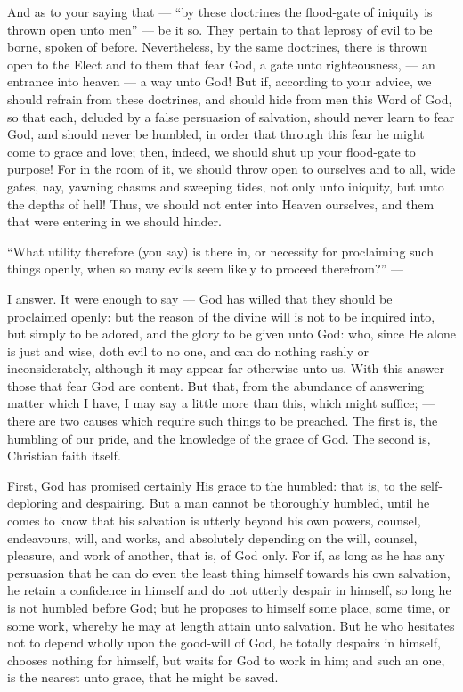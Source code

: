 And as to your saying that — “by these doctrines the flood-gate of iniquity is thrown open unto men” — be it so. They pertain to that leprosy of evil to be borne, spoken of before. Nevertheless, by the same doctrines, there is thrown open to the Elect and to them that fear God, a gate unto righteousness, — an entrance into heaven — a way unto God! But if, according to your advice, we should refrain from these doctrines, and should hide from men this Word of God, so that each, deluded by a false persuasion of salvation, should never learn to fear God, and should never be humbled, in order that through this fear he might come to grace and love; then, indeed, we should shut up your flood-gate to purpose! For in the room of it, we should throw open to ourselves and to all, wide gates, nay, yawning chasms and sweeping tides, not only unto iniquity, but unto the depths of hell! Thus, we should not enter into Heaven ourselves, and them that were entering in we should hinder.

“What utility therefore (you say) is there in, or necessity for proclaiming such things openly, when so many evils seem likely to proceed therefrom?” —

I answer. It were enough to say — God has willed that they should be proclaimed openly: but the reason of the divine will is not to be inquired into, but simply to be adored, and the glory to be given unto God: who, since He alone is just and wise, doth evil to no one, and can do nothing rashly or inconsiderately, although it may appear far otherwise unto us. With this answer those that fear God are content. But that, from the abundance of answering matter which I have, I may say a little more than this, which might suffice; — there are two causes which require such things to be preached. The first is, the humbling of our pride, and the knowledge of the grace of God. The second is, Christian faith itself.

First, God has promised certainly His grace to the humbled: that is, to the self-deploring and despairing. But a man cannot be thoroughly humbled, until he comes to know that his salvation is utterly beyond his own powers, counsel, endeavours, will, and works, and absolutely depending on the will, counsel, pleasure, and work of another, that is, of God only. For if, as long as he has any persuasion that he can do even the least thing himself towards his own salvation, he retain a confidence in himself and do not utterly despair in himself, so long he is not humbled before God; but he proposes to himself some place, some time, or some work, whereby he may at length attain unto salvation. But he who hesitates not to depend wholly upon the good-will of God, he totally despairs in himself, chooses nothing for himself, but waits for God to work in him; and such an one, is the nearest unto grace, that he might be saved.

